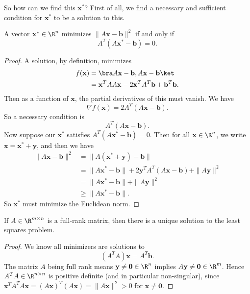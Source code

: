 \documentclass[a4paper]{article}
\begin{document}
So how can we find this $\mathbf{x}^*$? First of all, we find a necessary and sufficient condition for $\mathbf{x}^*$ to be a solution to this.
\begin{thm}
  A vector $\mathbf{x}^* \in \R^n$ minimizes $\|A\mathbf{x} - \mathbf{b}\|^2$ if and only if
  \[
    A^T(A\mathbf{x}^* - \mathbf{b}) = 0.
  \]
\end{thm}

\begin{proof}
  A solution, by definition, minimizes
  \begin{align*}
    f(\mathbf{x}) &= \bra A\mathbf{x} - \mathbf{b}, A\mathbf{x} - \mathbf{b}\ket\\
    &= \mathbf{x}^T AA\mathbf{x} - 2\mathbf{x}^T A^T \mathbf{b} + \mathbf{b}^T \mathbf{b}.
  \end{align*}
  Then as a function of $\mathbf{x}$, the partial derivatives of this must vanish. We have
  \[
    \nabla f(\mathbf{x}) = 2A^T(A\mathbf{x} - \mathbf{b}).
  \]
  So a necessary condition is
  \[
    A^T (A\mathbf{x} - \mathbf{b}).
  \]
  Now suppose our $\mathbf{x}^*$ satisfies $A^T (A\mathbf{x}^* - \mathbf{b}) = 0$. Then for all $\mathbf{x} \in \R^n$, we write $\mathbf{x} = \mathbf{x}^* + \mathbf{y}$, and then we have
  \begin{align*}
    \|A\mathbf{x} - \mathbf{b}\|^2 &= \|A(\mathbf{x}^* + \mathbf{y}) - \mathbf{b}\|\\
    &= \|A \mathbf{x}^* - \mathbf{b}\| + 2\mathbf{y}^T A^T (A\mathbf{x} - \mathbf{b}) + \|A\mathbf{y}\|^2\\
    &= \|A \mathbf{x}^* - \mathbf{b}\| + \|A\mathbf{y}\|^2\\
    &\geq \|A \mathbf{x}^* - \mathbf{b}\|.
  \end{align*}
  So $\mathbf{x}^*$ must minimize the Euclidean norm.
\end{proof}

\begin{cor}
  If $A \in \R^{m \times n}$ is a full-rank matrix, then there is a unique solution to the least squares problem.
\end{cor}

\begin{proof}
  We know all minimizers are solutions to
  \[
    (A^T A)\mathbf{x} = A^T \mathbf{b}.
  \]
  The matrix $A$ being full rank means $\mathbf{y} \not= \mathbf{0} \in \R^n$ implies $A\mathbf{y} \not= \mathbf{0} \in \R^m$. Hence $A^T A \in \R^{n \times n}$ is positive definite (and in particular non-singular), since $\mathbf{x}^TA^T A\mathbf{x} = (A \mathbf{x})^T (A \mathbf{x}) = \|A \mathbf{x}\|^2 > 0$ for $\mathbf{x} \not= \mathbf{0}$.
\end{proof}
\end{document}
